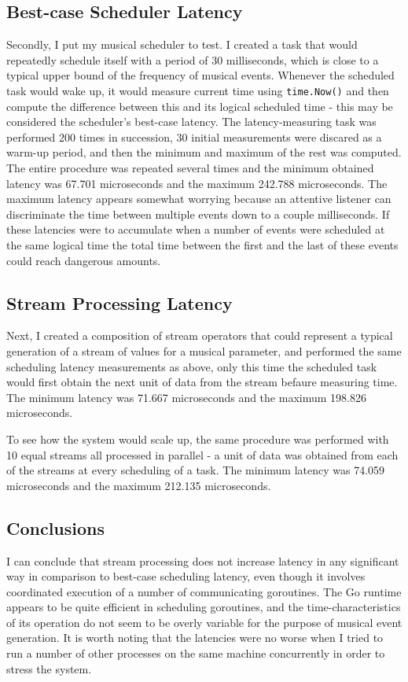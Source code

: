 \documentclass {article}
\begin{document}
\subsection{Best-case Scheduler Latency}

Secondly, I put my musical scheduler to test. I created a task that would
repeatedly schedule itself with a period of 30 milliseconds, which is close to a
typical upper bound of the frequency of musical events. Whenever the scheduled
task would wake up, it would measure current time using \lstinline|time.Now()|
and then compute the difference between this and its logical scheduled time -
this may be considered the scheduler's best-case latency. The latency-measuring
task was performed 200 times in succession, 30 initial measurements were
discared as a warm-up period, and then the minimum and maximum of the rest was
computed. The entire procedure was repeated several times and the minimum
obtained latency was 67.701 microseconds and the maximum 242.788 microseconds.
The maximum latency appears somewhat worrying because an attentive listener can
discriminate the time between multiple events down to a couple milliseconds. If
these latencies were to accumulate when a number of events were scheduled at the
same logical time the total time between the first and the last of these events
could reach dangerous amounts.

\subsection{Stream Processing Latency}

Next, I created a composition of stream operators that could represent
a typical generation of a stream of values for a musical parameter, and
performed the same scheduling latency measurements as above, only this time the
scheduled task would first obtain the next unit of data from the stream befaure
measuring time. The minimum latency was 71.667 microseconds and the maximum
198.826 microseconds.

To see how the system would scale up, the same procedure was performed with 10
equal streams all processed in parallel - a unit of data was obtained from each
of the streams at every scheduling of a task. The minimum latency was 74.059
microseconds and the maximum 212.135 microseconds.

\subsection{Conclusions}

I can conclude that stream processing does not increase latency in any
significant way in comparison to best-case scheduling latency, even though it
involves coordinated execution of a number of communicating goroutines. The Go
runtime appears to be quite efficient in scheduling goroutines, and the
time-characteristics of its operation do not seem to be overly variable for the
purpose of musical event generation. It is worth noting that the latencies were
no worse when I tried to run a number of other processes on the same machine
concurrently in order to stress the system.
\end{document}
